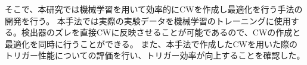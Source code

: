 そこで、本研究では機械学習を用いて効率的にCWを作成し最適化を行う手法の開発を行う。
本手法では実際の実験データを機械学習のトレーニングに使用する。検出器のズレを直接CWに反映させることが可能であるので、CWの作成と最適化を同時に行うことができる。
また、本手法で作成したCWを用いた際のトリガー性能についての評価を行い、トリガー効率が向上することを確認した。





